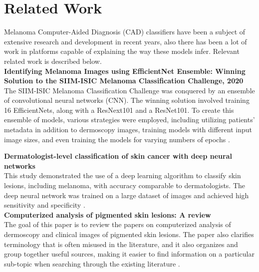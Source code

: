 \section{Related Work}

Melanoma Computer-Aided Diagnosis (CAD) classifiers have been a subject of
extensive research and development in recent years, also there has been a lot
of work in platforms capable of explaining the way these models infer. Relevant
related work is described below. \\

\vspace{0.5cm}
\textbf{Identifying Melanoma Images using EfficientNet Ensemble: Winning
Solution to the SIIM-ISIC Melanoma Classification Challenge, 2020} \\

The SIIM-ISIC Melanoma Classification Challenge was conquered by an ensemble of
convolutional neural networks (CNN). The winning solution involved training 16
EfficientNets, along with a ResNext101 and a ResNet101. To create this ensemble
of models, various strategies were employed, including utilizing patients'
metadata in addition to dermoscopy images, training models with different input
image sizes, and even training the models for varying numbers of epochs
\cite{WinningISIC}.

\vspace{0.5cm} \textbf{Dermatologist-level classification of skin cancer with
deep neural networks} \\

This study demonstrated the use of a deep learning algorithm to classify skin
lesions, including melanoma, with accuracy comparable to dermatologists. The
deep neural network was trained on a large dataset of images and achieved high
sensitivity and specificity \cite{SkinCancerDeepNN}. \\

\vspace{0.5cm} \textbf{Computerized analysis of pigmented skin lesions: A
review}  \\

The goal of this paper is to review the papers on computerized analysis of
dermoscopy and clinical images of pigmented skin lesions. The paper also
clarifies terminology that is often misused in the literature, and it also
organizes and group together useful sources, making it easier to find
information on a particular sub-topic when searching through the existing
literature \cite{MelanomaTopicsReview}. \\

